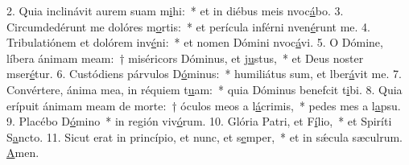 2. Quia inclinávit aurem suam m\uline{i}hi:~* et in diébus meis nvoc\uline{á}bo.
3. Circumdedérunt me dolóres m\uline{o}rtis:~* et perícula inférni nven\uline{é}runt me.
4. Tribulatiónem et dolórem inv\uline{é}ni:~* et nomen Dómini nvoc\uline{á}vi.
5. O Dómine, líbera ánimam meam:~† miséricors Dóminus, et j\uline{u}stus,~* et Deus noster mser\uline{é}tur.
6. Custódiens párvulos D\uline{ó}minus:~* humiliátus sum, et lber\uline{á}vit me.
7. Convértere, ánima mea, in réquiem t\uline{u}am:~* quia Dóminus benefcit t\uline{i}bi.
8. Quia erípuit ánimam meam de morte:~† óculos meos a l\uline{á}crimis,~* pedes mes a l\uline{a}psu.
9. Placébo D\uline{ó}mino~* in región viv\uline{ó}rum.
10. Glória Patri, et F\uline{í}lio,~* et Spiríti S\uline{a}ncto.
11. Sicut erat in princípio, et nunc, et s\uline{e}mper,~* et in sǽcula sæculrum. \uline{A}men.
